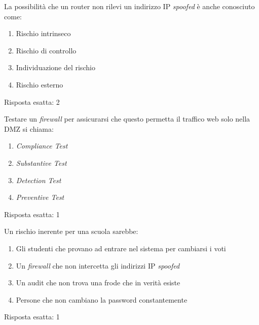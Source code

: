 \begin{Exercise} [
  title={Quiz},
  label={audit8}
  ]

  \Question La possibilità che un router non rilevi un indirizzo IP 
\textit{spoofed} è anche conosciuto come:
\begin{enumerate}
 \item Rischio intrinseco
 \item Rischio di controllo
 \item Individuazione del rischio
 \item Rischio esterno
\end{enumerate}  

\end{Exercise}


\begin{Answer} [
  ref={audit8},
  number={8}
  ]

  \Question Risposta esatta: 2

\end{Answer}

\begin{Exercise} [
  title={Quiz},
  label={audit9}
  ]

  \Question Testare un \textit{firewall} per assicurarsi che questo 
permetta il traffico web solo nella DMZ si chiama:
\begin{enumerate}
 \item \textit{Compliance Test}
 \item \textit{Substantive Test}
 \item \textit{Detection Test}
 \item \textit{Preventive Test}
\end{enumerate}
\end{Exercise}


\begin{Answer} [
  ref={audit9},
  number={9}
  ]

  \Question Risposta esatta: 1

\end{Answer}

\begin{Exercise} [
  title={Quiz},
  label={audit10}
  ]

  \Question Un rischio inerente per una scuola sarebbe:
\begin{enumerate}
 \item Gli studenti che provano ad entrare nel sistema per cambiarsi i voti
 \item Un \textit{firewall} che non intercetta gli indirizzi IP \textit{spoofed}
 \item Un audit che non trova una frode che in verità esiste
 \item Persone che non cambiano la password constantemente
\end{enumerate}
  
\end{Exercise}


\begin{Answer} [
  ref={audit10},
  number={10}
  ]

  \Question Risposta esatta: 1

\end{Answer}
